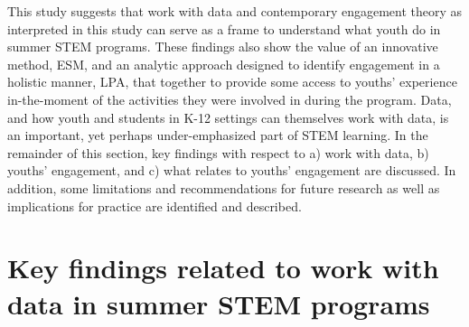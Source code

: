 \documentclass[]{book}
\theoremstyle{definition}
\theoremstyle{definition}
\theoremstyle{definition}
\theoremstyle{remark}
\begin{document}
This study suggests that work with data and contemporary engagement
theory as interpreted in this study can serve as a frame to understand
what youth do in summer STEM programs. These findings also show the
value of an innovative method, ESM, and an analytic approach designed to
identify engagement in a holistic manner, LPA, that together to provide
some access to youths' experience in-the-moment of the activities they
were involved in during the program. Data, and how youth and students in
K-12 settings can themselves work with data, is an important, yet
perhaps under-emphasized part of STEM learning. In the remainder of this
section, key findings with respect to a) work with data, b) youths'
engagement, and c) what relates to youths' engagement are discussed. In
addition, some limitations and recommendations for future research as
well as implications for practice are identified and described.

\section{Key findings related to work with data in summer STEM
programs}\label{key-findings-related-to-work-with-data-in-summer-stem-programs}
\end{document}
